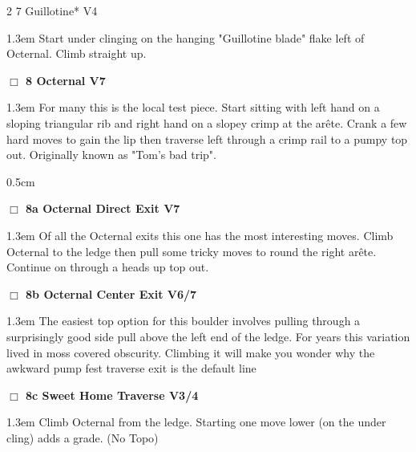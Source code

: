 \begin{multicols}{2}
{{{7 Guillotine* V4  
}}}
\begin{adjustwidth}{1.3em}{}			
Start under clinging on the hanging "Guillotine blade" flake left of Octernal. Climb straight up.
\end{adjustwidth}
\needspace{2em}
\label{rt:Octernal}
\colorbox{Goldenrod!20}{
\parbox{0.95\linewidth}{
\hspace{-1ex}\textbf{$\Box$
8 Octernal V7  
}}}
\begin{adjustwidth}{1.3em}{}			
For many this is the local test piece. Start sitting with left hand on a sloping triangular rib and right hand on a slopey crimp at the arête. Crank a few hard moves to gain the lip then traverse left through a crimp rail to a pumpy top out. Originally known as "Tom's bad trip".
\end{adjustwidth}
\begin{adjustwidth}{0.5cm}{}				
\needspace{4em}
\needspace{2em}
\label{vr:Octernal Direct Exit}
\colorbox{Goldenrod!20}{
\parbox{0.95\linewidth}{
\hspace{-1ex}\textbf{$\Box$
8a Octernal Direct Exit V7  
}}}
\begin{adjustwidth}{1.3em}{}			
Of all the Octernal exits this one has the most interesting moves. Climb Octernal to the ledge then pull some tricky moves to round the right arête. Continue on through a heads up top out.
\end{adjustwidth}
\needspace{2em}
\label{vr:Octernal Center Exit}
\colorbox{Goldenrod!20}{
\parbox{0.95\linewidth}{
\hspace{-1ex}\textbf{$\Box$
8b Octernal Center Exit V6/7  
}}}
\begin{adjustwidth}{1.3em}{}			
The easiest top option for this boulder involves pulling through a surprisingly good side pull above the left end of the ledge. For years this variation lived in moss covered obscurity. Climbing it will make you wonder why the awkward pump fest traverse exit is the default line
\end{adjustwidth}
\needspace{2em}
\label{vr:Sweet Home Traverse}
\colorbox{RoyalBlue!20}{
\parbox{0.95\linewidth}{
\hspace{-1ex}\textbf{$\Box$
8c Sweet Home Traverse V3/4  
}}}
\begin{adjustwidth}{1.3em}{}			
Climb Octernal from the ledge. Starting one move lower (on the under cling) adds a grade.
  (No Topo)
\end{adjustwidth}
\end{adjustwidth}
	\end{multicols}
